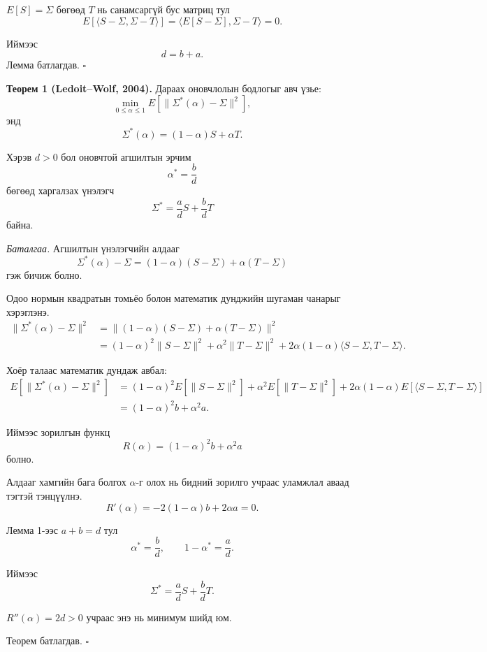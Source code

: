 $E[S]=\Sigma$ бөгөөд $T$ нь
санамсаргүй бус матриц тул
\[
E\left[
\langle S-\Sigma,\Sigma-T\rangle
\right]
=
\langle E[S-\Sigma],\Sigma-T\rangle
=0.
\]

Иймээс
\[
d=b+a.
\]
Лемма батлагдав. \hfill $\square$

\medskip
\noindent
\textbf{Теорем 1 (Ledoit--Wolf, 2004).}
Дараах оновчлолын бодлогыг авч үзье:
\[
\min_{0\leq\alpha\leq1}
E\left[
\|\Sigma^*(\alpha)-\Sigma\|^2
\right],
\]
энд
\[
\Sigma^*(\alpha)
=
(1-\alpha)S+\alpha T.
\]

Хэрэв $d>0$ бол оновчтой
агшилтын эрчим
\[
\alpha^*=\frac{b}{d}
\]
бөгөөд харгалзах үнэлэгч
\[
	\Sigma^*
	=
	\frac{a}{d}S
	+
	\frac{b}{d}T
\]
байна.

\medskip
\noindent
\textit{Баталгаа.}
Агшилтын үнэлэгчийн алдааг
\[
\Sigma^*(\alpha)-\Sigma
=
(1-\alpha)(S-\Sigma)
+\alpha(T-\Sigma)
\]
гэж бичиж болно.

Одоо нормын квадратын томьёо болон математик дунджийн шугаман чанарыг хэрэглэнэ.
\[
\begin{aligned}
	\|\Sigma^*(\alpha)-\Sigma\|^2&=\|(1-\alpha)(S-\Sigma)
	+\alpha(T-\Sigma)\|^2\\
	&=(1-\alpha)^2\|S-\Sigma\|^2+\alpha^2\|T-\Sigma\|^2+2\alpha(1-\alpha)
	\langle S-\Sigma,T-\Sigma\rangle.
\end{aligned}
\]

Хоёр талаас математик дундаж авбал:
\[
\begin{aligned}
	E\left[\|\Sigma^*(\alpha)-\Sigma\|^2\right]&=(1-\alpha)^2E\left[\|S-\Sigma\|^2\right]+\alpha^2E\left[\|T-\Sigma\|^2\right]+2\alpha(1-\alpha)E\left[\langle S-\Sigma,T-\Sigma\rangle\right]\\
	&=
	(1-\alpha)^2b+\alpha^2a.
\end{aligned}
\]

Иймээс зорилгын функц
\[
R(\alpha)
=
(1-\alpha)^2b+\alpha^2a
\]
болно.

Алдааг хамгийн бага болгох \(\alpha\)-г олох нь бидний зорилго учраас уламжлал аваад тэгтэй тэнцүүлнэ.
\[
R'(\alpha)
=
-2(1-\alpha)b+2\alpha a=0.
\]

Лемма 1-ээс $a+b=d$ тул
\[
\alpha^*=\frac{b}{d}, \qquad 
1-\alpha^*=\frac{a}{d}.
\]

Иймээс
\[
	\Sigma^*
	=
	\frac{a}{d}S
	+
	\frac{b}{d}T.
\]

$R''(\alpha)=2d>0$ учраас
энэ нь минимум шийд юм.

Теорем батлагдав. \hfill $\square$

\medskip



